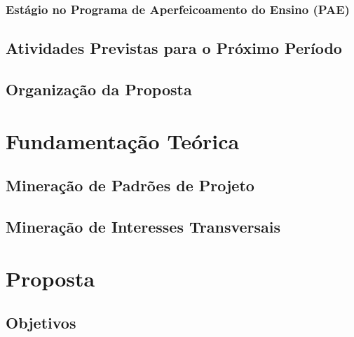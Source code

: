 \documentclass[a4paper,11pt]{article}
\begin{document}
	 \subsubsection{Estágio no Programa de Aperfeicoamento do Ensino (PAE)} %
	 \label{sub:est_gio_no_programa_de_aperfeicoamento_do_ensino_}
	 
	 	
	 
	 \subsection{Atividades Previstas para o Próximo Período} %
	 \label{sub:atividades_previstas_para_o_pr_ximo_per_odo}
	 
	 	

	 	

	
	\subsection{Organização da Proposta}\label{org}

\section{Fundamentação Teórica}\label{sec:fundamentacao}


\subsection{Mineração de Padrões de Projeto}\label{sub:mineracao}


 
\subsection{Mineração de Interesses Transversais}\label{sub:mineracao}


\section{Proposta}\label{sec:proposta}


\subsection{Objetivos}\label{sec:Objetivos}
\end{document}
